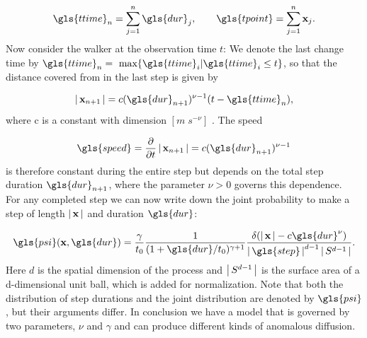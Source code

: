 \begin{align}
\gls{ttime}_n = \sum_{j=1}^n \gls{dur}_j , \qquad \gls{tpoint} = \sum_{j=1}^n \ve{x}_j .
\end{align}
%
Now consider the walker at the observation time $t$: We denote the last change time by $\gls{ttime}_n = \text{ max} \{\gls{ttime}_i | \gls{ttime}_i \leq t \}$, so that the distance covered from in the last step is given by

\begin{align}
\abs{\ve{x}_{n+1}} = c (\gls{dur}_{n+1})^{\nu-1} (t-\gls{ttime}_n) ,
\end{align}
%
where c is a constant with dimension $ [ m \; s^{-\nu} ] $ . The speed 

\begin{align}
\gls{speed} = \pder{}{t} \abs{\ve{x}_{n+1}} = c (\gls{dur}_{n+1})^{\nu-1}
\end{align}
%
is therefore constant during the entire step but depends on the total step duration $\gls{dur}_{n+1}$, where the parameter $\nu>0$ governs this dependence. \\
For any completed step we can now write down the joint probability to make a step of length $\left|\,\mathbf{ x }\,\right|$ and duration $\gls{dur}$:

\begin{align}
\gls{psi}(\ve{x}, \gls{dur} ) = \frac{\gamma}{t_0} \frac{1}{(1+\gls{dur}/t_0)^{\gamma+1}}  \frac{\delta(\abs{\ve{x}} - c \gls{dur}^{\nu}) }{\abs{\gls{step}}^{d-1} \abs{S^{d-1}}}  \label{eqn:defPsiXT}.
\end{align}
%
Here $d$ is the spatial dimension of the process and $\left|\,S^{d-1}\,\right|$ is the surface area of a d-dimensional unit ball, which is added for normalization. Note that both the distribution of step durations and the joint distribution are denoted by $\gls{psi}$, but their arguments differ. In conclusion we have a model that is governed by two parameters, $\nu$ and $\gamma$ and can produce different kinds of anomalous diffusion. 

%
%



